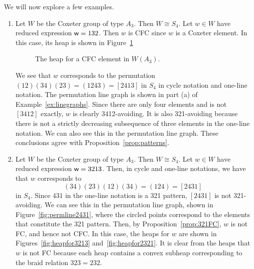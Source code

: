 \begin{example}\label{ex:permscyclic} We will now explore a few examples. \begin{enumerate}[leftmargin=0.75in, label=(\alph*)]
\item Let $W$ be the Coxeter group of type $A_3$. Then $W \cong S_4$. Let $w \in W$ have reduced expression $\mathsf{w} = 132$. Then $w$ is CFC since $w$ is a Coxeter element. In this case, its heap is shown in Figure~\ref{fig:cycheapex1}

\begin{center} \begin{figure}[H] \centering
{}
\caption{The heap for a CFC element in $W(A_3)$.}\label{fig:cycheapex1}
\end{figure} \end{center}
    We see that $w$ corresponds to the permutation $(12)(34)(23) = (1243) = [2413]$ in $S_4$ in cycle notation and one-line notation.
    The permutation line graph is shown in part (a) of Example~\ref{ex:linegraphs}.
    Since there are only four elements and is not $[3412]$ exactly, $w$ is clearly 3412-avoiding. It is also 321-avoiding because there is not a strictly decreasing subsequence of three elements in the one-line notation. We can also see this in the permutation line graph.
    These conclusions agree with Proposition~\ref{prop:patterns}.
	
\item Let $W$ be the Coxeter group of type $A_3$. Then $W \cong S_4$. Let $w \in W$ have reduced expression $\mathsf{w} = 3213$. Then, in cycle and one-line notations, we have that $w$ corresponds to $$(34)(23)(12)(34) = (124) = [2431]$$ in $S_4$.
    Since $431$ in the one-line notation is a 321 pattern, $[2431]$ is not 321-avoiding.
    We can see this in the permutation line graph, shown in Figure~\ref{fig:permline2431}, where the circled points correspond to the elements that constitute the 321 pattern.
    Then, by Proposition~\ref{prop:321FC}, $w$ is not FC, and hence not CFC. In this case, the heaps for $w$ are shown in Figures~\ref{fig:heapfor3213} and~\ref{fig:heapfor2321}.
    It is clear from the heaps that $w$ is not FC because each heap contains a convex subheap corresponding to the braid relation $323 = 232$.


\end{enumerate}
\end{example}
